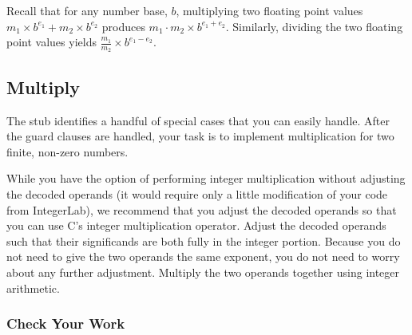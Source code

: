 Recall that for any number base, $b$, multiplying two floating point values $m_1 \times b^{e_1} + m_2 \times b^{e_2}$ produces $m_1 \cdot m_2 \times b^{e_1 + e_2}$.
Similarly, dividing the two floating point values yields $\frac{m_1}{m_2} \times b^{e_1 - e_2}$.

\subsection{Multiply}

The  stub identifies a handful of special cases that you can easily handle.
After the guard clauses are handled, your task is to implement multiplication for two finite, non-zero numbers.

While you have the option of performing integer multiplication without adjusting the decoded operands (it would require only a little modification of your code from IntegerLab), we recommend that you adjust the decoded operands so that you can use C's integer multiplication operator.
Adjust the decoded operands such that their significands are both fully in the integer portion.
Because you do not need to give the two operands the same exponent, you do not need to worry about any further adjustment.
Multiply the two operands together using integer arithmetic.

\subsubsection*{Check Your Work}

